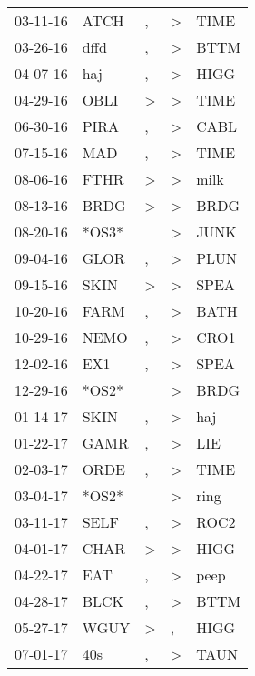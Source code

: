 \begin{supertabular}{lllll}
 03-11-16 &   ATCH &             , &     \textgreater &   TIME \\
 03-26-16 &   dffd &             , &     \textgreater &   BTTM \\
 04-07-16 &    haj &             , &     \textgreater &   HIGG \\
 04-29-16 &   OBLI &  \textgreater &     \textgreater &   TIME \\
 06-30-16 &   PIRA &             , &     \textgreater &   CABL \\
 07-15-16 &    MAD &             , &     \textgreater &   TIME \\
 08-06-16 &   FTHR &  \textgreater &     \textgreater &   milk \\
 08-13-16 &   BRDG &  \textgreater &     \textgreater &   BRDG \\
 08-20-16 &  *OS3* &               &     \textgreater &   JUNK \\
 09-04-16 &   GLOR &             , &     \textgreater &   PLUN \\
 09-15-16 &   SKIN &  \textgreater &     \textgreater &   SPEA \\
 10-20-16 &   FARM &             , &     \textgreater &   BATH \\
 10-29-16 &   NEMO &             , &     \textgreater &   CRO1 \\
 12-02-16 &    EX1 &             , &     \textgreater &   SPEA \\
 12-29-16 &  *OS2* &               &     \textgreater &   BRDG \\
 01-14-17 &   SKIN &             , &     \textgreater &    haj \\
 01-22-17 &   GAMR &             , &     \textgreater &    LIE \\
 02-03-17 &   ORDE &             , &     \textgreater &   TIME \\
 03-04-17 &  *OS2* &               &     \textgreater &   ring \\
 03-11-17 &   SELF &             , &     \textgreater &   ROC2 \\
 04-01-17 &   CHAR &  \textgreater &     \textgreater &   HIGG \\
 04-22-17 &    EAT &             , &     \textgreater &   peep \\
 04-28-17 &   BLCK &             , &     \textgreater &   BTTM \\
 05-27-17 &   WGUY &  \textgreater &                , &   HIGG \\
 07-01-17 &    40s &             , &     \textgreater &   TAUN \\

\end{supertabular}
